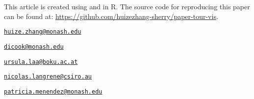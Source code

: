 This article is created using \citep{knitr} and
 \citep{rmarkdown} in R. The source code for
reproducing this paper can be found at:
\url{https://github.com/huizezhang-sherry/paper-tour-vis}.

\clearpage




\address{%
H.Sherry Zhang\\
Monash University\\
Department of Econometrics and Business Statistics\\
}
\href{mailto:huize.zhang@monash.edu}{\nolinkurl{huize.zhang@monash.edu}}

\address{%
Dianne Cook\\
Monash University\\
Department of Econometrics and Business Statistics\\
}
\href{mailto:dicook@monash.edu}{\nolinkurl{dicook@monash.edu}}

\address{%
Ursula Laa\\
University of Natural Resources and Life Sciences\\
Institute of Statistics\\
}
\href{mailto:ursula.laa@boku.ac.at}{\nolinkurl{ursula.laa@boku.ac.at}}

\address{%
Nicolas Langrené\\
CSIRO Data61\\
34 Village Street, Docklands VIC 3008 Australia\\
}
\href{mailto:nicolas.langrene@csiro.au}{\nolinkurl{nicolas.langrene@csiro.au}}

\address{%
Patricia Menéndez\\
Monash University\\
Department of Econometrics and Business Statistics\\
}
\href{mailto:patricia.menendez@monash.edu}{\nolinkurl{patricia.menendez@monash.edu}}

